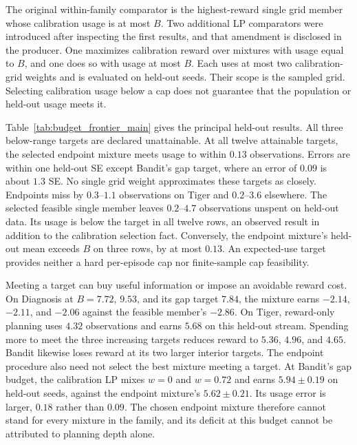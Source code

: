 The original within-family comparator is the highest-reward single grid member whose calibration usage is at most $B$. Two additional LP comparators were introduced after inspecting the first results, and that amendment is disclosed in the producer. One maximizes calibration reward over mixtures with usage equal to $B$, and one does so with usage at most $B$. Each uses at most two calibration-grid weights and is evaluated on held-out seeds. Their scope is the sampled grid. Selecting calibration usage below a cap does not guarantee that the population or held-out usage meets it.

Table~\ref{tab:budget_frontier_main} gives the principal held-out results. All three below-range targets are declared unattainable. At all twelve attainable targets, the selected endpoint mixture meets usage to within $0.13$ observations. Errors are within one held-out SE except Bandit's gap target, where an error of $0.09$ is about $1.3$ SE. No single grid weight approximates these targets as closely. Endpoints miss by $0.3$--$1.1$ observations on Tiger and $0.2$--$3.6$ elsewhere. The selected feasible single member leaves $0.2$--$4.7$ observations unspent on held-out data. Its usage is below the target in all twelve rows, an observed result in addition to the calibration selection fact. Conversely, the endpoint mixture's held-out mean exceeds $B$ on three rows, by at most $0.13$. An expected-use target provides neither a hard per-episode cap nor finite-sample cap feasibility.


Meeting a target can buy useful information or impose an avoidable reward cost. On Diagnosis at $B{=}7.72$, $9.53$, and its gap target $7.84$, the mixture earns $-2.14$, $-2.11$, and $-2.06$ against the feasible member's $-2.86$. On Tiger, reward-only planning uses $4.32$ observations and earns $5.68$ on this held-out stream. Spending more to meet the three increasing targets reduces reward to $5.36$, $4.96$, and $4.65$. Bandit likewise loses reward at its two larger interior targets. The endpoint procedure also need not select the best mixture meeting a target. At Bandit's gap budget, the calibration LP mixes $w{=}0$ and $w{=}0.72$ and earns $5.94\pm0.19$ on held-out seeds, against the endpoint mixture's $5.62\pm0.21$. Its usage error is larger, $0.18$ rather than $0.09$. The chosen endpoint mixture therefore cannot stand for every mixture in the family, and its deficit at this budget cannot be attributed to planning depth alone.

